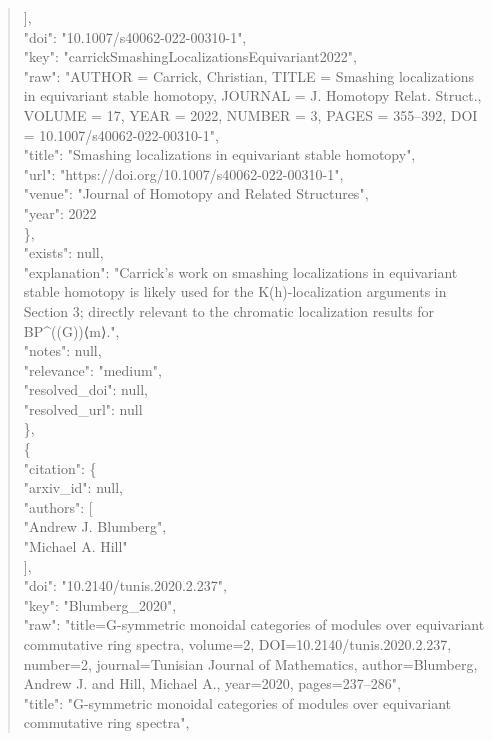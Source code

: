 \documentclass[11pt]{article}
\begin{document}
\begin{quote}
        ],\\
        "doi": "10.1007/s40062-022-00310-1",\\
        "key": "carrickSmashingLocalizationsEquivariant2022",\\
        "raw": "AUTHOR = Carrick, Christian, TITLE = Smashing localizations in equivariant stable homotopy, JOURNAL = J. Homotopy Relat. Struct., VOLUME = 17, YEAR = 2022, NUMBER = 3, PAGES = 355--392, DOI = 10.1007/s40062-022-00310-1",\\
        "title": "Smashing localizations in equivariant stable homotopy",\\
        "url": "https://doi.org/10.1007/s40062-022-00310-1",\\
        "venue": "Journal of Homotopy and Related Structures",\\
        "year": 2022\\
      \},\\
      "exists": null,\\
      "explanation": "Carrick's work on smashing localizations in equivariant stable homotopy is likely used for the K(h)-localization arguments in Section 3; directly relevant to the chromatic localization results for BP\^{}((G))⟨m⟩.",\\
      "notes": null,\\
      "relevance": "medium",\\
      "resolved\_doi": null,\\
      "resolved\_url": null\\
    \},\\
    \{\\
      "citation": \{\\
        "arxiv\_id": null,\\
        "authors": [\\
          "Andrew J. Blumberg",\\
          "Michael A. Hill"\\
        ],\\
        "doi": "10.2140/tunis.2020.2.237",\\
        "key": "Blumberg\_2020",\\
        "raw": "title=G-symmetric monoidal categories of modules over equivariant commutative ring spectra, volume=2, DOI=10.2140/tunis.2020.2.237, number=2, journal=Tunisian Journal of Mathematics, author=Blumberg, Andrew J. and Hill, Michael A., year=2020, pages=237--286",\\
        "title": "G-symmetric monoidal categories of modules over equivariant commutative ring spectra",\\

\end{quote}
\end{document}
